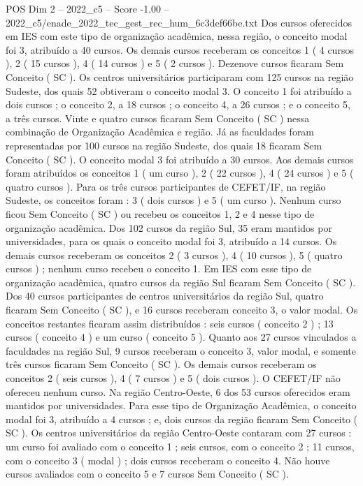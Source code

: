 \begin{textsample}{POS Dim 2 – 2022\_c5 – Score -1.00 – 2022\_c5/enade\_2022\_tec\_gest\_rec\_hum\_6c3def66be.txt}
Dos cursos oferecidos em IES com este tipo de organização acadêmica, nessa região, o conceito modal foi 3, atribuído a 40 cursos.
Os demais cursos receberam os conceitos 1 ( 4 cursos ), 2 ( 15 cursos ), 4 ( 14 cursos ) e 5 ( 2 cursos ).
Dezenove cursos ficaram Sem Conceito ( SC ).
Os centros universitários participaram com 125 cursos na região Sudeste, dos quais 52 obtiveram o conceito modal 3.
O conceito 1 foi atribuído a dois cursos ; o conceito 2, a 18 cursos ; o conceito 4, a 26 cursos ; e o conceito 5, a três cursos.
Vinte e quatro cursos ficaram Sem Conceito ( SC ) nessa combinação de Organização Acadêmica e região.
Já as faculdades foram representadas por 100 cursos na região Sudeste, dos quais 18 ficaram Sem Conceito ( SC ).
O conceito modal 3 foi atribuído a 30 cursos.
Aos demais cursos foram atribuídos os conceitos 1 ( um curso ), 2 ( 22 cursos ), 4 ( 24 cursos ) e 5 ( quatro cursos ).
Para os três cursos participantes de CEFET/IF, na região Sudeste, os conceitos foram : 3 ( dois cursos ) e 5 ( um curso ).
Nenhum curso ficou Sem Conceito ( SC ) ou recebeu os conceitos 1, 2 e 4 nesse tipo de organização acadêmica.
Dos 102 cursos da região Sul, 35 eram mantidos por universidades, para os quais o conceito modal foi 3, atribuído a 14 cursos.
Os demais cursos receberam os conceitos 2 ( 3 cursos ), 4 ( 10 cursos ), 5 ( quatro cursos ) ; nenhum curso recebeu o conceito 1.
Em IES com esse tipo de organização acadêmica, quatro cursos da região Sul ficaram Sem Conceito ( SC ).
Dos 40 cursos participantes de centros universitários da região Sul, quatro ficaram Sem Conceito ( SC ), e 16 cursos receberam conceito 3, o valor modal.
Os conceitos restantes ficaram assim distribuídos : seis cursos ( conceito 2 ) ; 13 cursos ( conceito 4 ) e um curso ( conceito 5 ).
Quanto aos 27 cursos vinculados a faculdades na região Sul, 9 cursos receberam o conceito 3, valor modal, e somente três cursos ficaram Sem Conceito ( SC ).
Os demais cursos receberam os conceitos 2 ( seis cursos ), 4 ( 7 cursos ) e 5 ( dois cursos ).
O CEFET/IF não ofereceu nenhum curso.
Na região Centro-Oeste, 6 dos 53 cursos oferecidos eram mantidos por universidades.
Para esse tipo de Organização Acadêmica, o conceito modal foi 3, atribuído a 4 cursos ; e, dois cursos da região ficaram Sem Conceito ( SC ).
Os centros universitários da região Centro-Oeste contaram com 27 cursos : um curso foi avaliado com o conceito 1 ; seis cursos, com o conceito 2 ; 11 cursos, com o conceito 3 ( modal ) ; dois cursos receberam o conceito 4.
Não houve cursos avaliados com o conceito 5 e 7 cursos Sem Conceito ( SC ).

\end{textsample}
